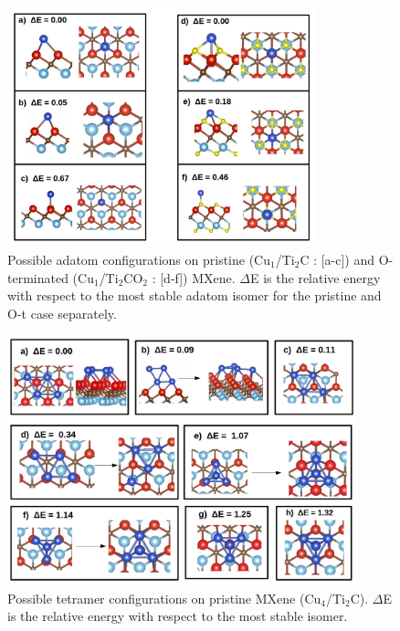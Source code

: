 \begin{figure}[htb]
  \begin{center}
    \includegraphics[width=0.8\textwidth]{./Appendix2/Appendix2_figures/photo2.jpg}
  \end{center}
    \caption{Possible adatom configurations on pristine (Cu$_1$/Ti$_2$C : [a-c]) and O-terminated (Cu$_1$/Ti$_2$CO$_2$ : [d-f]) MXene. $\Delta$E is the relative energy with respect to the most stable adatom isomer for the pristine and O-t case separately.}
  \label{fig-02}
\end{figure}


\begin{figure}[htb]
  \begin{center}
    \includegraphics[width=0.9\textwidth]{./Appendix2/Appendix2_figures/photo5.jpg}
  \end{center}
    \caption{Possible tetramer configurations on pristine MXene (Cu$_4$/Ti$_2$C). $\Delta$E is the relative energy with respect to the most stable isomer.}
  \label{fig05}
\end{figure}

